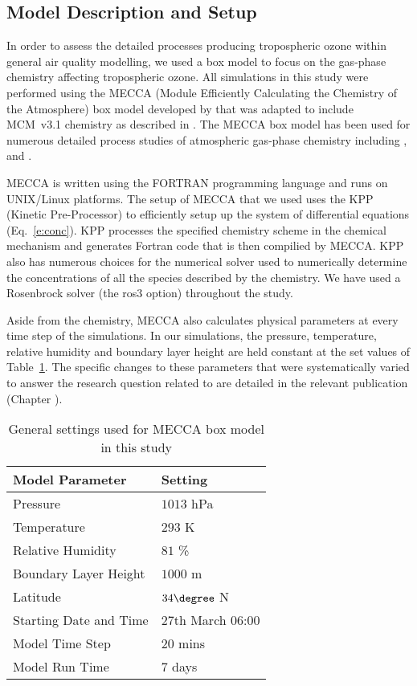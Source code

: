 \subsection{Model Description and Setup}
In order to assess the detailed processes producing tropospheric ozone within general air quality modelling, we used a box model to focus on the gas-phase chemistry affecting tropospheric ozone.
All simulations in this study were performed using the MECCA (Module Efficiently Calculating the Chemistry of the Atmosphere) box model developed by \citet{Sander:2005} that was adapted to include MCM~v3.1 chemistry as described in \citet{Butler:2011}.
The MECCA box model has been used for numerous detailed process studies of atmospheric gas-phase chemistry including \citet{Kubistin:2010}, \citet{Xie:2008} and \citet{Lourens:2012}.

MECCA is written using the FORTRAN programming language and runs on UNIX/Linux platforms.
The setup of MECCA that we used uses the KPP (Kinetic Pre-Processor) \citep{Damian:2002} to efficiently setup up the system of differential equations (Eq.~\eqref{e:conc}).
KPP processes the specified chemistry scheme in the chemical mechanism and generates Fortran code that is then compilied by MECCA.
KPP also has numerous choices for the numerical solver used to numerically determine the concentrations of all the species described by the chemistry.
We have used a Rosenbrock solver (the ros3 option) throughout the study.

Aside from the chemistry, MECCA also calculates physical parameters at every time step of the simulations.
In our simulations, the pressure, temperature, relative humidity and boundary layer height are held constant at the set values of Table~\ref{t:model_setup}.
The specific changes to these parameters that were systematically varied to answer the research question related to  are detailed in the relevant publication (Chapter ). 

\begin{table}
    \begin{center}
        \caption{General settings used for MECCA box model in this study}
        \begin{tabular}{ll}
            \hline \hline
            \textbf{Model Parameter} & \textbf{Setting} \\
            \hline \hline
            Pressure & $1013$ hPa \\
            Temperature & $293$ K \\
            Relative Humidity & $81$ \% \\
            Boundary Layer Height & $1000$ m \\
            Latitude & $34\degree$ N \\
            Starting Date and Time & 27th March 06:00 \\
            Model Time Step & $20$ mins \\
            Model Run Time & $7$ days \\
            \hline \hline
        \end{tabular}
        \label{t:model_setup}
    \end{center}
\end{table}

